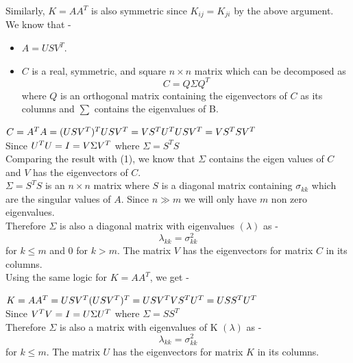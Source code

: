 \documentclass[11pt]{article}
\begin{document}
{Similarly, $K = AA^T$ is also symmetric since $K_{ij} = K_{ji}$ by the above argument.\\

We know that -
\begin{itemize}
\item $A = USV^T$.
\item $C$ is a real, symmetric, and square $n \times n$ matrix which can be decomposed as 
\begin{equation}
C=Q \Sigma Q^T
\end{equation}	
where  $Q$ is an orthogonal matrix containing the eigenvectors of $C$ as its columns and $\sum$ contains the eigenvalues of B.\\
\end{itemize} 
$C = A^T A = (USV^T)^TUSV^T \\
= V S^T U^T U S V^T  \\
= V S^T S V^T  \hspace{30 mm}$ Since $U^T U = I\\
= V \Sigma V^T$ \hspace{30 mm} where $\Sigma = S^T S$\\

Comparing the result with (1), we know that $\Sigma$ contains the eigen values of $C$ and $V$ has the eigenvectors of $C$.\\

$\Sigma = S^T S$ is an $n \times n$ matrix where $S$ is a diagonal matrix containing $\sigma_{kk}$ which are the singular values of $A$. Since $n \gg m$ we will only have $m$ non zero eigenvalues.\\

Therefore $\Sigma$ is also a diagonal matrix with eigenvalues $(\lambda)$ as -
$$\lambda_{kk} = \sigma_{kk}^2$$ for $k \leq m$ and 0 for $k > m$. The matrix $V$ has the eigenvectors for matrix $C$ in its columns.\\

Using the same logic for $K = AA^T$, we get -

$K = A A^T = USV^T(USV^T)^T \\
= U S V^T V S^T U^T \\
= U S S^T U^T  \hspace{30 mm}$ Since $V^T V = I\\
= U \Sigma U^T$ \hspace{30 mm} where $\Sigma = S S^T$\\

Therefore $\Sigma$ is also a matrix with eigenvalues of K $(\lambda)$ as -
$$\lambda_{kk} = \sigma_{kk}^2$$ for $k \leq m$. The matrix $U$ has the eigenvectors for matrix $K$ in its columns.\\

}
\end{document}
